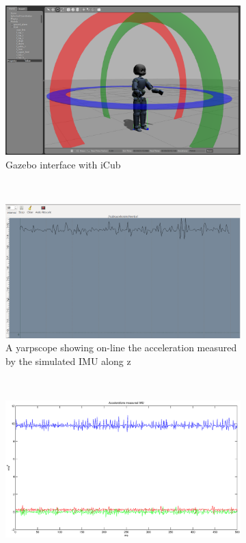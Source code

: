 \begin{figure}
        \centering
        \begin{subfigure}[b]{0.475\textwidth}
                \includegraphics[width=\textwidth]{images/icub_imu_b.eps}
                \caption{Gazebo interface with iCub}
                \label{yarp_simulation_icub_a}
        \end{subfigure}%
        \\
        \begin{subfigure}[b]{0.475\textwidth}
                \includegraphics[width=\textwidth]{images/icub_imu_a.eps}
                \caption{A yarpscope showing on-line the acceleration measured by the simulated IMU along z}
                \label{yarp_simulation_icub_b}
        \end{subfigure}
        \\
        \begin{subfigure}[b]{0.475\textwidth}
                \includegraphics[width=\textwidth]{images/icub_imu_c.eps}

\end{subfigure}
\end{figure}
